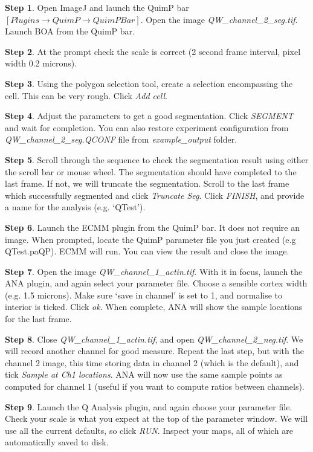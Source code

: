 \documentclass[a4paper,12pt]{article}
\begin{document}
\textbf{Step 1}. Open ImageJ and launch the QuimP bar $[Plugins\rightarrow QuimP\rightarrow QuimP Bar]$.  Open the image \textit{QW\_channel\_2\_seg.tif}.  Launch BOA from the QuimP bar.

\textbf{Step 2}. At the prompt check the scale is correct (2 second frame interval, pixel width 0.2 microns).

\textbf{Step 3}. Using the polygon selection tool, create a selection encompassing the cell. This can be very rough.
Click \emph{Add cell}.

\textbf{Step 4}.  Adjust the parameters to get a good segmentation.  Click \emph{SEGMENT} and wait for completion. You can also restore experiment configuration from \textit{QW\_channel\_2\_seg.QCONF} file from \textit{example\_output} folder.

\textbf{Step 5}. Scroll through the sequence to check the segmentation result using either the scroll bar or mouse
wheel. The segmentation should have completed to the last frame.  If not, we will truncate the segmentation.
Scroll to the last frame which successfully segmented and click \emph{Truncate Seg}.
Click \emph{FINISH}, and provide a name for the analysis (e.g. `QTest').

\textbf{Step 6}. Launch the ECMM plugin from the QuimP bar. It does not require an image. When prompted,
locate the QuimP parameter file you just created (e.g QTest.paQP).  ECMM will run.
You can view the result and close the image.

\textbf{Step 7}. Open the image \textit{QW\_channel\_1\_actin.tif}.  With it in focus, launch the ANA plugin,
and again select your parameter file.  Choose a sensible cortex width (e.g. 1.5 microns).
Make sure `save in channel' is set to 1, and normalise to interior is ticked.  Click \emph{ok}.
When complete, ANA will show the sample locations for the last frame.

\textbf{Step 8}. Close \textit{QW\_channel\_1\_actin.tif}, and open \textit{QW\_channel\_2\_neg.tif}.  We will record another
channel for good measure.  Repeat the last step, but with the channel 2 image, this time storing
data in channel 2 (which is the default), and tick \emph{Sample at Ch1 locations}.  ANA will now
use the same sample points as computed for channel 1 (useful if you want to compute ratios between channels).

\textbf{Step 9}. Launch the Q Analysis plugin, and again choose your parameter file. Check your scale is what you expect at the top of the parameter window. We will use all the
current defaults, so click \emph{RUN}.  Inspect your maps, all of which are automatically saved to disk.
\end{document}
